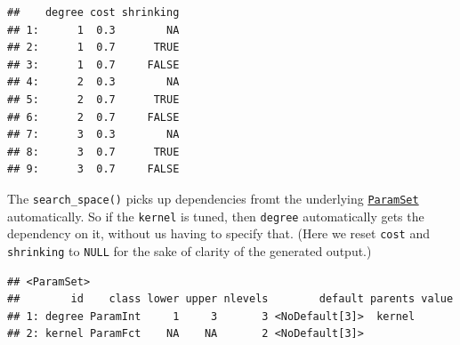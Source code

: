 \documentclass[
]{scrbook}
\newenvironment{Shaded}{\begin{snugshade}}{\end{snugshade}}
\newcommand{\AttributeTok}[1]{\textcolor[rgb]{0.77,0.63,0.00}{#1}}
\newcommand{\ConstantTok}[1]{\textcolor[rgb]{0.00,0.00,0.00}{#1}}
\newcommand{\DecValTok}[1]{\textcolor[rgb]{0.00,0.00,0.81}{#1}}
\newcommand{\FunctionTok}[1]{\textcolor[rgb]{0.00,0.00,0.00}{#1}}
\newcommand{\NormalTok}[1]{#1}
\newcommand{\OtherTok}[1]{\textcolor[rgb]{0.56,0.35,0.01}{#1}}
\newcommand{\SpecialCharTok}[1]{\textcolor[rgb]{0.00,0.00,0.00}{#1}}
\newcommand{\StringTok}[1]{\textcolor[rgb]{0.31,0.60,0.02}{#1}}
\renewenvironment{Shaded} {\begin{snugshade}\small} {\end{snugshade}}
\begin{document}
\begin{Shaded}
\end{Shaded}

\begin{verbatim}
##    degree cost shrinking
## 1:      1  0.3        NA
## 2:      1  0.7      TRUE
## 3:      1  0.7     FALSE
## 4:      2  0.3        NA
## 5:      2  0.7      TRUE
## 6:      2  0.7     FALSE
## 7:      3  0.3        NA
## 8:      3  0.7      TRUE
## 9:      3  0.7     FALSE
\end{verbatim}

The \texttt{search\_space()} picks up dependencies fromt the underlying \href{https://paradox.mlr-org.com/reference/ParamSet.html}{\texttt{ParamSet}} automatically.
So if the \texttt{kernel} is tuned, then \texttt{degree} automatically gets the dependency on it, without us having to specify that.
(Here we reset \texttt{cost} and \texttt{shrinking} to \texttt{NULL} for the sake of clarity of the generated output.)

\begin{Shaded}
\end{Shaded}

\begin{verbatim}
## <ParamSet>
##        id    class lower upper nlevels        default parents value
## 1: degree ParamInt     1     3       3 <NoDefault[3]>  kernel      
## 2: kernel ParamFct    NA    NA       2 <NoDefault[3]>
\end{verbatim}
\end{document}

